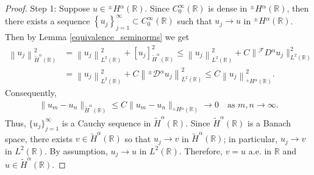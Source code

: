 \documentclass[leqno,final]{siamltex}
\numberwithin{equation}{section}
\renewcommand{\(}{\bigl(}
\renewcommand{\)}{\bigr)}
\newcommand{\R}{\mathbb{R}}
\begin{document}
        \begin{proof}
            Step 1: Suppose $u\in{^{\pm}}{{H}}{^{\alpha}}(\R)$. Since $C^{\infty}_{0}(\R)$ is dense in ${^{\pm}}{{H}}{^{\alpha}}(\R)$, then there exists a sequence $\left\{u_j \right\}_{j=1}^{\infty} \subset C^{\infty}_{0}(\R)$ such that $ u_j \rightarrow u$ in ${^{\pm}}{{H}}{^{\alpha}}(\R)$. 
            Then by Lemma \ref{equivalence_seminorms} we get 
            \begin{align*}
                \left\|u _j \right\|_{\widetilde{H}^{\alpha}(\R)}^{2} &= \left\| u _j \right\|_{L^{2}(\R)}^{2} + \left[ u_j \right]_{\widetilde{H}^{\alpha}(\R)}^{2} 
                \leq  \left\|u_j \right\|_{L^{2}(\R)}^{2} + C \| {^{\mathcal{F}}}{D}{^{\alpha}} u_j \|_{L^{2}(\R)}^{2}   \\ 
                &=    \left\|u _ j\right\|_{L^{2}(\R)}^{2} + C\left\|{^{\pm}}{\mathcal{D}}{^{\alpha}} u_j \right\|_{L^{2}(\R)}^{2}  
                \leq  C \left\|u_j \right\|_{{^{\pm}}{{H}}{^{\alpha}}(\R)}^{2}.
            \end{align*}
            Consequently,
            \begin{align*}
                \|u_m - u_n\|_{\widetilde{H}^{\alpha}(\R)} \leq C \|u_m - u_n \|_{{^{\pm}}{H}{^{\alpha}}(\R)}\to 0 \quad\mbox{as } m,n\to \infty.
            \end{align*}
             Thus, $\{u_j\}_{j=1}^{\infty}$ is a Cauchy sequence in $\widetilde{H}^{\alpha}(\R)$. Since $\widetilde{H}^{\alpha}(\R)$ is a Banach space, there exists $v \in \widetilde{H}^{\alpha}(\R)$ so that $u_j \rightarrow v$ in $\widetilde{H}^{\alpha}(\R)$; in particular, $u_j \rightarrow v$ in $L^{2}(\R)$. By assumption, $u_j \rightarrow u$ in $L^{2}(\R)$. Therefore, $v = u$ a.e. in $\R$ and $u \in \widetilde{H}^{\alpha}(\R)$. 
         


\end{proof}
\end{document}
